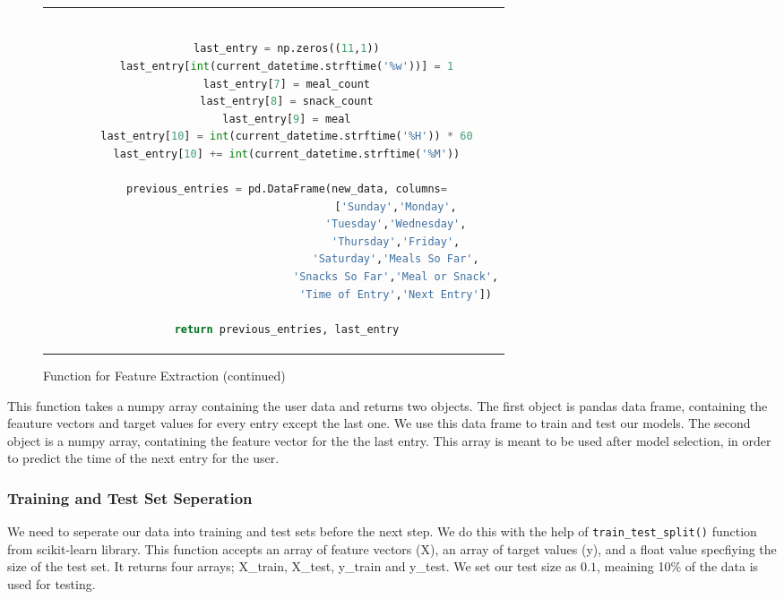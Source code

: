 \begin{figure}
  \ContinuedFloat
  \begin{tabular}{c}
  \begin{lstlisting}[language=python, breaklines, breakatwhitespace]

    last_entry = np.zeros((11,1))
    last_entry[int(current_datetime.strftime('%w'))] = 1
    last_entry[7] = meal_count
    last_entry[8] = snack_count
    last_entry[9] = meal
    last_entry[10] = int(current_datetime.strftime('%H')) * 60
    last_entry[10] += int(current_datetime.strftime('%M'))

    previous_entries = pd.DataFrame(new_data, columns=
                                      ['Sunday','Monday',
                                      'Tuesday','Wednesday',
                                      'Thursday','Friday',
                                      'Saturday','Meals So Far',
                                      'Snacks So Far','Meal or Snack',
                                      'Time of Entry','Next Entry'])

    return previous_entries, last_entry

  \end{lstlisting}
  \end{tabular}
  \caption[]{Function for Feature Extraction (continued)}
\end{figure}
\newpage
This function takes a numpy array containing the user data and returns two objects.
The first object is pandas data frame, containing the feauture vectors and target values for every entry except the last one.
We use this data frame to train and test our models.
The second object is a numpy array, contatining the feature vector for the the last entry.
This array is meant to be used after model selection, in order to predict the time of the next entry for the user.

\subsubsection{Training and Test Set Seperation}
We need to seperate our data into training and test sets before the next step.
We do this with the help of \texttt{train\_test\_split()} function from scikit-learn library.
This function accepts an array of feature vectors (X), an array of target values (y), and a float value specfiying the size of the test set.
It returns four arrays; X\_train, X\_test, y\_train and y\_test.
We set our test size as $0.1$, meaining 10\% of the data is used for testing.

